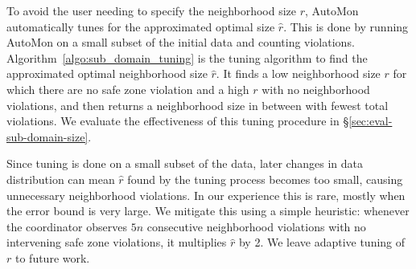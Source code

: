 To avoid the user needing to specify the neighborhood size $r$, AutoMon automatically tunes for the approximated optimal size $\hat{r}$.
This is done by running AutoMon on a small subset of the initial data and counting violations.
Algorithm~\ref{algo:sub_domain_tuning} is the tuning algorithm to find the approximated optimal neighborhood size $\hat{r}$.
It finds a low neighborhood size $r$ for which there are no safe zone violation and a high $r$ with no neighborhood violations, and then returns a neighborhood size in between with fewest total violations.
We evaluate the effectiveness of this tuning procedure in \S\ref{sec:eval-sub-domain-size}.

Since tuning is done on a small subset of the data, later changes in data distribution can mean $\hat{r}$ found by the tuning process becomes too small, causing unnecessary neighborhood violations.
In our experience this is rare, mostly when the error bound is very large.
We mitigate this using a simple heuristic:
whenever the coordinator observes $5 n$ consecutive neighborhood violations with no intervening safe zone violations, it multiplies $\hat{r}$ by 2.
We leave adaptive tuning of $r$ to future work.
